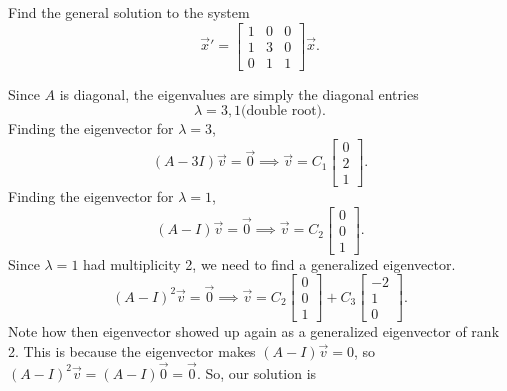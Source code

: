 \begin{example}
	Find the general solution to the system
	\begin{equation*}
		\vec{x}' = \begin{bmatrix}
			1 & 0 & 0 \\
			1 & 3 & 0 \\
			0 & 1 & 1
		\end{bmatrix} \vec{x}.
	\end{equation*}
\end{example}
\noindent
Since $A$ is diagonal, the eigenvalues are simply the diagonal entries
\begin{equation*}
	\lambda = 3, 1 \text{(double root)}.
\end{equation*}
Finding the eigenvector for $\lambda  = 3$,
\begin{equation*}
	(A - 3I)\vec{v} = \vec{0} \implies \vec{v} = C_1 \begin{bmatrix}
		0 \\
		2 \\
		1
	\end{bmatrix}.
\end{equation*}
Finding the eigenvector for $\lambda = 1$,
\begin{equation*}
	(A - I)\vec{v} = \vec{0} \implies \vec{v} = C_2 \begin{bmatrix}
		0 \\
		0 \\
		1
	\end{bmatrix}.
\end{equation*}
Since $\lambda  =1$ had multiplicity 2, we need to find a generalized eigenvector.
\begin{equation*}
	(A - I)^2\vec{v} = \vec{0} \implies \vec{v} = C_2 \begin{bmatrix}
		0 \\
		0 \\
		1
	\end{bmatrix} + C_3 \begin{bmatrix}
		-2 \\
		1 \\
		0
	\end{bmatrix}.
\end{equation*}
Note how then eigenvector showed up again as a generalized eigenvector of rank 2.
This is because the eigenvector makes $(A - I)\vec{v} = 0$, so $(A - I)^2\vec{v} = (A - I)\vec{0} = \vec{0}$.
So, our solution is
